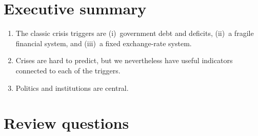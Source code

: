 \section*{Executive summary}

\setlength{\leftmargini}{.5\oldleftmargini}
\begin{enumerate}\itemsep=0.0in
\item The classic crisis triggers are
(i)~government debt and deficits,
(ii)~a fragile financial system,
and (iii)~a fixed exchange-rate system.

\item Crises are hard to predict,
but we nevertheless have useful indicators connected to each
of the triggers.

\item Politics and institutions are central.
\end{enumerate}
\setlength{\leftmargini}{\oldleftmargini}

%

\section*{Review questions}

